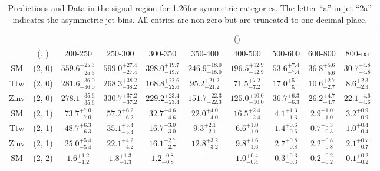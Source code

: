 \begin{table}[h!]
\tiny
\centering
\caption{Predictions and Data in the signal region for 1.26\ifb for symmetric categories. The letter ``a'' in jet \eg ``2a''  indicates the asymmetric jet bins. All entries are non-zero but are truncated to one decimal place.\label{tab:yieldsnodatapost_sig_comb_sym}}
\begin{tabular}
{cccccccccc}
	\hline\hline
&	&	& \multicolumn{8}{c}{\scalht (\gev)}\\ 
	&	 (\njet, \nb) & 200-250 & 250-300 & 300-350 & 350-400 & 400-500 & 500-600 & 600-800 & 800-$\infty$ \\ [0.8ex] 
\hline
	SM & (2, 0) & $559.6^{+ 25.3 }_{- 25.3 }$ & $599.0^{+ 27.4 }_{- 27.4 }$ & $398.0^{+ 19.7 }_{- 19.7 }$ & $246.9^{+ 18.0 }_{- 18.0 }$ & $196.5^{+ 12.9 }_{- 12.9 }$ & $53.6^{+ 7.4 }_{- 7.4 }$ & $36.8^{+ 5.6 }_{- 5.6 }$ & $30.7^{+ 4.8 }_{- 4.8 }$ \\[0.5ex] 
	Ttw & (2, 0) & $281.6^{+ 36.0 }_{- 36.0 }$ & $268.3^{+ 38.2 }_{- 38.2 }$ & $168.8^{+ 22.6 }_{- 22.6 }$ & $95.2^{+ 21.2 }_{- 21.2 }$ & $71.5^{+ 7.2 }_{- 7.2 }$ & $17.0^{+ 5.1 }_{- 5.1 }$ & $10.6^{+ 2.7 }_{- 2.7 }$ & $8.6^{+ 2.3 }_{- 2.3 }$ \\[0.5ex] 
	Zinv & (2, 0) & $278.1^{+ 35.6 }_{- 35.6 }$ & $330.7^{+ 37.2 }_{- 37.2 }$ & $229.2^{+ 23.4 }_{- 23.4 }$ & $151.7^{+ 22.3 }_{- 22.3 }$ & $125.0^{+ 10.0 }_{- 10.0 }$ & $36.7^{+ 6.3 }_{- 6.3 }$ & $26.2^{+ 4.7 }_{- 4.7 }$ & $22.1^{+ 4.6 }_{- 4.6 }$ \\[0.5ex] 
	SM & (2, 1) & $73.7^{+ 7.0 }_{- 7.0 }$ & $57.2^{+ 6.2 }_{- 6.2 }$ & $32.7^{+ 4.6 }_{- 4.6 }$ & $22.0^{+ 4.0 }_{- 4.0 }$ & $16.5^{+ 2.4 }_{- 2.4 }$ & $4.1^{+ 1.3 }_{- 1.3 }$ & $2.9^{+ 1.0 }_{- 1.0 }$ & $3.2^{+ 0.9 }_{- 0.9 }$ \\[0.5ex] 
	Ttw & (2, 1) & $48.7^{+ 6.3 }_{- 6.3 }$ & $35.1^{+ 5.4 }_{- 5.4 }$ & $16.7^{+ 3.0 }_{- 3.0 }$ & $9.3^{+ 2.1 }_{- 2.1 }$ & $6.6^{+ 1.0 }_{- 1.0 }$ & $1.4^{+ 0.6 }_{- 0.6 }$ & $0.7^{+ 0.3 }_{- 0.3 }$ & $1.0^{+ 0.4 }_{- 0.4 }$ \\[0.5ex] 
	Zinv & (2, 1) & $25.0^{+ 5.4 }_{- 5.4 }$ & $22.1^{+ 4.2 }_{- 4.2 }$ & $16.1^{+ 2.7 }_{- 2.7 }$ & $12.8^{+ 3.2 }_{- 3.2 }$ & $9.8^{+ 1.6 }_{- 1.6 }$ & $2.7^{+ 0.8 }_{- 0.8 }$ & $2.2^{+ 0.8 }_{- 0.8 }$ & $2.1^{+ 0.7 }_{- 0.7 }$ \\[0.5ex] 
	SM & (2, 2) & $1.6^{+ 1.2 }_{- 1.2 }$ & $1.8^{+ 1.3 }_{- 1.3 }$ & $1.2^{+ 0.8 }_{- 0.8 }$ & -- & $1.0^{+ 0.4 }_{- 0.4 }$ & $0.3^{+ 0.3 }_{- 0.3 }$ & $0.2^{+ 0.2 }_{- 0.2 }$ & $0.1^{+ 0.2 }_{- 0.2 }$ \\[0.5ex] 

\end{tabular}
\end{table}
